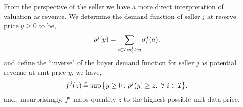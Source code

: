 From the perspective of the
seller we have a more direct interpretation of valuation as revenue.
We determine the demand function of seller $j$ at reserve price $y\ge 0$ to be,
\begin{equation}\label{datademand}
    \rho^j(y) = \sum_{i\in\mathcal{I} : p_i^j\ge y} \sigma_i^j(a), 
\end{equation}
and define the ``inverse" of the buyer demand function for seller $j$ as
potential revenue at unit price $y$, we have, 
\begin{equation}\label{sellerinversedemand}
    f^j(z) \triangleq \sup\big\lbrace y\ge 0:
        \rho^j(y) \ge z, \ \forall \ i \in \mathcal{I}\big\rbrace,
\end{equation}
and, unsurprisingly, $f^j$ maps quantity $z$ to the highest possible unit data
price.

